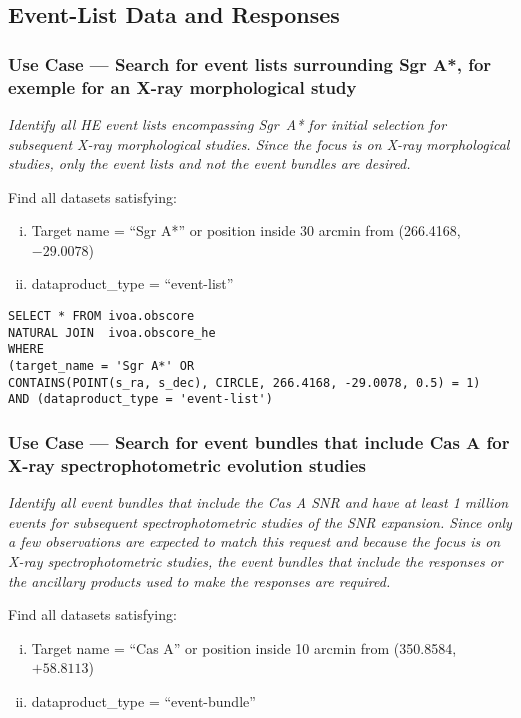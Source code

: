 \subsection{Event-List Data and Responses}


\subsubsection{Use Case --- Search for event lists surrounding Sgr A*, for exemple for an X-ray morphological study}

{\em Identify all \gls{HE} event lists encompassing Sgr~A* for initial selection for subsequent X-ray morphological studies.  Since the focus is on X-ray morphological studies, only the event lists and not the event bundles are desired.\/}

\medskip
\noindent Find all datasets satisfying:
\begin{enumerate}[(i)]
  \item Target name = ``Sgr A*'' or position inside 30 arcmin from (266.4168, $-29.0078$)
  \item dataproduct\_type = ``event-list''
\end{enumerate}

\begin{verbatim}
SELECT * FROM ivoa.obscore
NATURAL JOIN  ivoa.obscore_he 
WHERE
(target_name = 'Sgr A*' OR
CONTAINS(POINT(s_ra, s_dec), CIRCLE, 266.4168, -29.0078, 0.5) = 1) 
AND (dataproduct_type = 'event-list')
\end{verbatim}


\subsubsection{Use Case --- Search for event bundles that include Cas A for X-ray spectrophotometric evolution studies}

{\em Identify all event bundles that include the Cas A SNR and have at least 1 million events for subsequent spectrophotometric studies of the SNR expansion. Since only a few observations are expected to match this request and because the focus is on X-ray spectrophotometric studies, the event bundles that include the responses or the ancillary products used to make the responses are required.\/}

\medskip
\noindent Find all datasets satisfying:
\begin{enumerate}[(i)]
  \item Target name = ``Cas A'' or position inside 10 arcmin from (350.8584, $+58.8113$)
  \item dataproduct\_type = ``event-bundle''
\end{enumerate}

